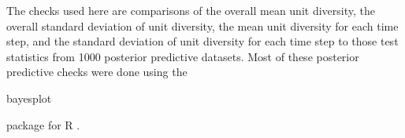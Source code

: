 \documentclass[12pt,letterpaper]{article}
\begin{document}
The checks used here are comparisons of the overall mean unit diversity, the overall standard deviation of unit diversity, the mean unit diversity for each time step, and the standard deviation of unit diversity for each time step to those test statistics from 1000 posterior predictive datasets. Most of these posterior predictive checks were done using the \begin{tt} bayesplot \end{tt} package for R \citep{bayesplotR}.
\end{document}
